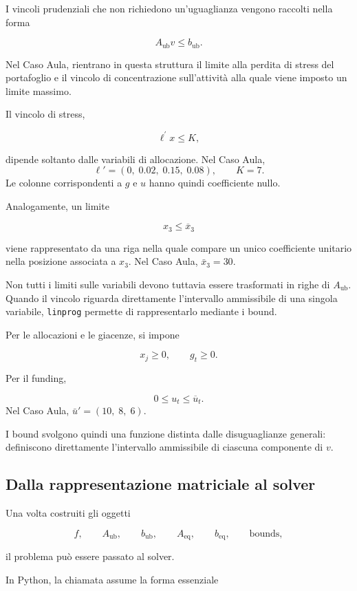 I vincoli prudenziali che non richiedono un'uguaglianza vengono raccolti
nella forma

\[
A_{\mathrm{ub}}v\leq b_{\mathrm{ub}}.
\]

Nel Caso Aula, rientrano in questa struttura il limite alla perdita di stress
del portafoglio e il vincolo di concentrazione sull'attivit\`a alla quale
viene imposto un limite massimo.

Il vincolo di stress,

\[
\ell^{\prime}x\leq K,
\]

\noindent dipende soltanto dalle variabili di allocazione. Nel Caso Aula,
\[
\ell'=(0,\;0.02,\;0.15,\;0.08), \qquad K=7.
\]
Le colonne corrispondenti a
$g$ e $u$ hanno quindi coefficiente nullo.

Analogamente, un limite

\[
x_3\leq \overline{x}_3
\]

\noindent viene rappresentato da una riga nella quale compare un unico coefficiente
unitario nella posizione associata a $x_3$. Nel Caso Aula, $\bar x_3=30$.

Non tutti i limiti sulle variabili devono tuttavia essere trasformati in
righe di $A_{\mathrm{ub}}$. Quando il vincolo riguarda direttamente
l'intervallo ammissibile di una singola variabile, \texttt{linprog} permette
di rappresentarlo mediante i bound.

Per le allocazioni e le giacenze, si impone

\[
x_j\geq 0,
\qquad
g_t\geq 0.
\]

Per il funding,

\[
0\leq u_t\leq \overline{u}_t.
\]
Nel Caso Aula, $\bar u'=(10,\;8,\;6)$.

I bound svolgono quindi una funzione distinta dalle disuguaglianze generali:
definiscono direttamente l'intervallo ammissibile di ciascuna componente di
$v$.

\subsection{Dalla rappresentazione matriciale al solver}

Una volta costruiti gli oggetti

\[
f,
\qquad
A_{\mathrm{ub}},
\qquad
b_{\mathrm{ub}},
\qquad
A_{\mathrm{eq}},
\qquad
b_{\mathrm{eq}},
\qquad
\text{bounds},
\]

\noindent il problema pu\`o essere passato al solver.

In Python, la chiamata assume la forma essenziale

